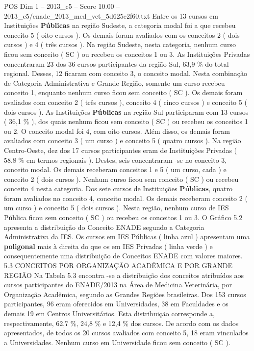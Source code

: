 \begin{textsample}{POS Dim 1 – 2013\_c5 – Score 10.00 – 2013\_c5/enade\_2013\_med\_vet\_5d625e2f60.txt}
Entre os 13 cursos em Instituições \textbf{Públicas} na região Sudeste, a categoria modal foi a que recebeu conceito 5 ( oito cursos ).
Os demais foram avaliados com os conceitos 2 ( dois cursos ) e 4 ( três cursos ).
Na região Sudeste, nesta categoria, nenhum curso ficou sem conceito ( SC ) ou recebeu os conceitos 1 ou 3.
As Instituições Privadas concentraram 23 dos 36 cursos participantes da região Sul, 63,9 \% do total regional.
Desses, 12 ficaram com conceito 3, o conceito modal.
Nesta combinação de Categoria Administrativa e Grande Região, somente um curso recebeu conceito 1, enquanto nenhum curso ficou sem conceito ( SC ).
Os demais foram avaliados com conceito 2 ( três cursos ), conceito 4 ( cinco cursos ) e conceito 5 ( dois cursos ).
As Instituições \textbf{Públicas} na região Sul participaram com 13 cursos ( 36,1 \% ), dos quais nenhum ficou sem conceito ( SC ) ou recebeu os conceitos 1 ou 2.
O conceito modal foi 4, com oito cursos.
Além disso, os demais foram avaliados com conceito 3 ( um curso ) e conceito 5 ( quatro cursos ).
Na região Centro-Oeste, dez dos 17 cursos participantes eram de Instituições Privadas ( 58,8 \% em termos regionais ).
Destes, seis concentraram -se no conceito 3, conceito modal.
Os demais receberam conceitos 1 e 5 ( um curso, cada ) e conceito 2 ( dois cursos ).
Nenhum curso ficou sem conceito ( SC ) ou recebeu conceito 4 nesta categoria.
Dos sete cursos de Instituições \textbf{Públicas}, quatro foram avaliados no conceito 4, conceito modal.
Os demais receberam conceito 2 ( um curso ) e conceito 5 ( dois cursos ).
Nesta região, nenhum curso de IES Pública ficou sem conceito ( SC ) ou recebeu os conceitos 1 ou 3.
O Gráfico 5.2 apresenta a distribuição do Conceito ENADE segundo a Categoria Administrativa da IES.
Os cursos em IES Públicas ( linha azul ) apresentam uma \textbf{poligonal} mais à direita do que os em IES Privadas ( linha verde ) e consequentemente uma distribuição de Conceitos ENADE com valores maiores. 5.3 CONCEITOS POR ORGANIZAÇÃO ACADÊMICA E POR GRANDE REGIÃO Na Tabela 5.3 encontra -se a distribuição dos conceitos atribuídos aos cursos participantes do ENADE/2013 na Área de Medicina Veterinária, por Organização Acadêmica, segundo as Grandes Regiões brasileiras.
Dos 153 cursos participantes, 96 eram oferecidos em Universidades, 38 em Faculdades e os demais 19 em Centros Universitários.
Esta distribuição corresponde a, respectivamente, 62,7 \%, 24,8 \% e 12,4 \% dos cursos.
De acordo com os dados apresentados, de todos os 20 cursos avaliados com conceito 5, 18 eram vinculados a Universidades.
Nenhum curso em Universidade ficou sem conceito ( SC ).

\end{textsample}
